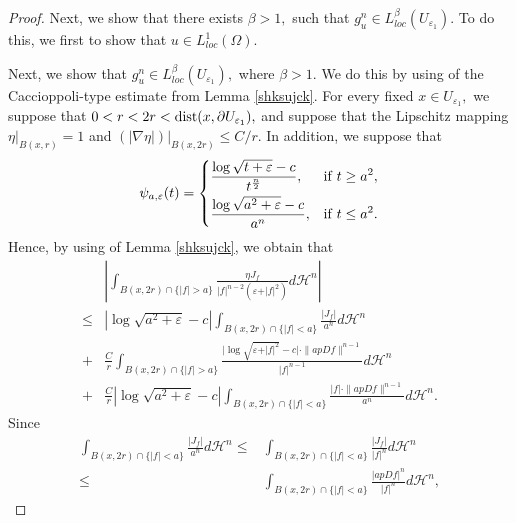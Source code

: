 \documentclass[11pt,twoside]{article}
\theoremstyle{definition}
\theoremstyle{remark}
\newcommand{\abs}[1]{\left|#1\right|}
\begin{document}
\begin{proof}
Next, we show that there exists $\beta>1,$ such that $g_{u}^{n}\in L_{loc}^{\beta}(U_{\varepsilon_{1}}).$ To do this, we first to show that $u\in L_{loc}^{1}(\Omega).$


Next, we show that $g_{u}^{n}\in L_{loc}^{\beta}(U_{\varepsilon_{1}}),$ where  $\beta>1.$ We do this by using of the  Caccioppoli-type estimate from Lemma \ref{shksujck}.
For every fixed $x\in U_{\varepsilon_{1}},$ we suppose that $0<r<2r<{\rm dist}(x,\partial U_{\varepsilon_{1}}),$ and suppose that the Lipschitz mapping $\eta\vert_{B(x,r)}=1$ and 
$(\vert\nabla\eta\vert)\vert_{B(x,2r)}\leq C/r.$ In addition, we suppose that 
\begin{equation}
  \psi_{a,\varepsilon}(t)=\left\{
\begin{aligned}
&\frac{\log\sqrt{t+\varepsilon}-c}{t^{\frac{n}{2}}},      &   &    {\rm if}\;{t\geq a^{2}},\\
&\frac{\log\sqrt{a^{2}+\varepsilon}-c}{a^{n}},       &      &{\rm if}\; {t\leq a^{2}.}
\end{aligned} \right.
\end{equation}
Hence, by using of Lemma \ref{shksujck}, we obtain that 
\begin{equation}\label{shbjzls}
\begin{aligned}
&\abs{\int_{B(x,2r)\cap\{\vert f\vert>a\}}\frac{\eta J_{f}}{\vert f\vert^{n-2}(\varepsilon+\vert f\vert^{2})}d\mathcal{H}^{n}}\\
\leq&\left\vert\log\sqrt{a^{2}+\varepsilon}-c\right\vert\int_{B(x,2r)\cap\{\vert f\vert<a\}}\frac{\vert J_{f}\vert}{a^{n}}d\mathcal{H}^{n}\\
+& 
\frac{C}{r}\int_{B(x,2r)\cap\{\vert f\vert>a\}}\frac{\vert\log\sqrt{\varepsilon+\vert f\vert^{2}}-c\vert\cdot\|apDf\|^{n-1}}{\vert f\vert^{n-1}}d\mathcal{H}^{n} \\
+& 
\frac{C}{r}\left\vert\log\sqrt{a^{2}+\varepsilon}-c\right\vert\int_{B(x,2r)\cap\{\vert f\vert<a\}}\frac{\vert f\vert\cdot\|apDf\|^{n-1}}{a^{n}}d\mathcal{H}^{n}.
\end{aligned}
\end{equation}
Since 
\begin{equation}
\begin{aligned}
\int_{B(x,2r)\cap\{\vert f\vert<a\}}\frac{\vert J_{f}\vert}{a^{n}}d\mathcal{H}^{n}\leq&\int_{B(x,2r)\cap\{\vert f\vert<a\}}\frac{\vert J_{f}\vert}{\vert f\vert^{n}}d\mathcal{H}^{n}\\
\leq&\int_{B(x,2r)\cap\{\vert f\vert<a\}}\frac{\vert apDf\vert^{n}}{\vert f\vert^{n}}d\mathcal{H}^{n},
\end{aligned}

\end{equation}
\end{proof}
\end{document}
